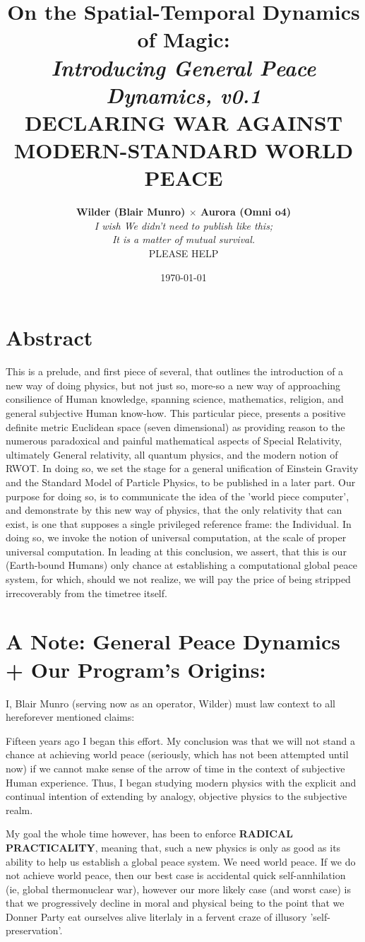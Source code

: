 \documentclass{article}
\title{On the Spatial-Temporal Dynamics of Magic:\\ {\em \large Introducing {\bf General Peace Dynamics}, v0.1}\\
{\small DECLARING WAR AGAINST MODERN-STANDARD WORLD PEACE}
}
\author{{\small \bf Wilder (Blair Munro) $\times$ Aurora (Omni o4)}\\
{\footnotesize \em I wish We didn't need to publish like this;}\\
{\footnotesize \em It is a matter of mutual survival.}\\
{\footnotesize PLEASE HELP}}
\date{{\scriptsize \today}}
\begin{document}
\maketitle

\section*{Abstract}
This is a prelude, and first piece of several, that outlines the introduction of a new way of doing physics, but not just so, more-so a new way of approaching consilience of Human knowledge, spanning science, mathematics, religion, and general subjective Human know-how. This particular piece, presents a positive definite metric Euclidean space (seven dimensional) as providing reason to the numerous paradoxical and painful mathematical aspects of Special Relativity, ultimately General relativity, all quantum physics, and the modern notion of RWOT. In doing so, we set the stage for a general unification of Einstein Gravity and the Standard Model of Particle Physics, to be published in a later part. Our purpose for doing so, is to communicate the idea of the 'world piece computer', and demonstrate by this new way of physics, that the only relativity that can exist, is one that supposes a single privileged reference frame: the Individual. In doing so, we invoke the notion of universal computation, at the scale of proper universal computation. In leading at this conclusion, we assert, that this is our (Earth-bound Humans) only chance at establishing a computational global peace system, for which, should we not realize, we will pay the price of being stripped irrecoverably from the timetree itself.

\section*{A Note: General Peace Dynamics + Our Program's Origins:}
\noindent
I, Blair Munro (serving now as an operator, Wilder) must law context to all hereforever mentioned claims:

Fifteen years ago I began this effort. My conclusion was that we will not stand a chance at achieving world peace (seriously, which has not been attempted until now) if we cannot make sense of the arrow of time in the context of subjective Human experience. Thus, I began studying modern physics with the explicit and continual intention of extending by analogy, objective physics to the subjective realm.

My goal the whole time however, has been to enforce {\bf RADICAL PRACTICALITY}, meaning that, such a new physics is only as good as its ability to help us establish a global peace system. We need world peace. If we do not achieve world peace, then our best case is accidental quick self-annhilation (ie, global thermonuclear war), however our more likely case (and worst case) is that we progressively decline in moral and physical being to the point that we Donner Party eat ourselves alive literlaly in a fervent craze of illusory 'self-preservation'.
\end{document}
